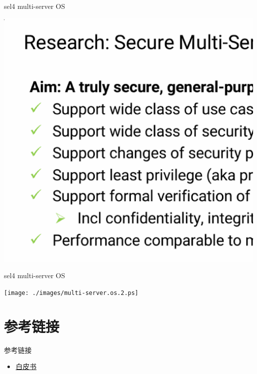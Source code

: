 \documentclass[presentation,dvipdfmx,CJKbookmarks]{beamer}
\begin{document}
\begin{CJK*}{UTF8}{simsun}
\begin{frame}[label={sec:org8174bdd}]{sel4 multi-server OS}
\begin{center}
\includegraphics[width=.9\linewidth]{./images/multi-server.os.ps}
\end{center}
\end{frame}

\begin{frame}[label={sec:orgb78d56d}]{sel4 multi-server OS}
\begin{center}
\texttt{[image: ./images/multi-server.os.2.ps]}
\end{center}
\end{frame}
\section{参考链接}
\label{sec:org42eda07}
\begin{frame}[label={sec:org0bf4249}]{参考链接}
\begin{itemize}
\item \href{https://sel4.systems/About/seL4-whitepaper.pdf}{白皮书}
\end{itemize}
\end{frame}
\end{CJK*}
\end{document}
